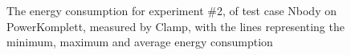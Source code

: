 \begin{figure}
                    \caption{The energy consumption for experiment \#2, of test case Nbody on PowerKomplett, measured by Clamp, with the lines representing the minimum, maximum and average energy consumption} \label{fig:time_series_Nbody_PowerKomplett_Clamp_exp2}
                    \end{figure}
                    